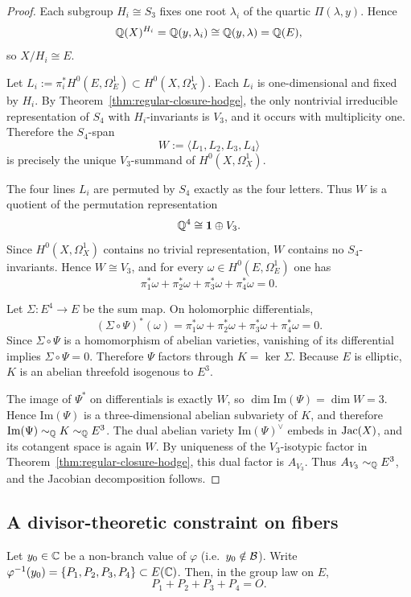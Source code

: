\begin{proof}
Each subgroup \(H_i\cong S_3\) fixes one root \(\lambda_i\) of the quartic \(\Pi(\lambda,y)\).
Hence
\[
\mathbb{Q}(X)^{H_i}=\mathbb{Q}(y,\lambda_i)\cong \mathbb{Q}(y,\lambda)=\mathbb{Q}(E),
\]
so \(X/H_i\cong E\).

Let \(L_i:=\pi_i^*H^0(E,\Omega_E^1)\subset H^0(X,\Omega_X^1)\).
Each \(L_i\) is one-dimensional and fixed by \(H_i\).
By Theorem~\ref{thm:regular-closure-hodge}, the only nontrivial irreducible representation of \(S_4\) with \(H_i\)-invariants is \(V_3\), and it occurs with multiplicity one.
Therefore the \(S_4\)-span
\[
W:=\langle L_1,L_2,L_3,L_4\rangle
\]
is precisely the unique \(V_3\)-summand of \(H^0(X,\Omega_X^1)\).

The four lines \(L_i\) are permuted by \(S_4\) exactly as the four letters.
Thus \(W\) is a quotient of the permutation representation
\[
\mathbb{Q}^4\cong \mathbf{1}\oplus V_3.
\]
Since \(H^0(X,\Omega_X^1)\) contains no trivial representation, \(W\) contains no \(S_4\)-invariants.
Hence \(W\cong V_3\), and for every \(\omega\in H^0(E,\Omega_E^1)\) one has
\[
\pi_1^*\omega+\pi_2^*\omega+\pi_3^*\omega+\pi_4^*\omega=0.
\]

Let \(\Sigma:E^4\to E\) be the sum map.
On holomorphic differentials,
\[
(\Sigma\circ\Psi)^*(\omega)=\pi_1^*\omega+\pi_2^*\omega+\pi_3^*\omega+\pi_4^*\omega=0.
\]
Since \(\Sigma\circ\Psi\) is a homomorphism of abelian varieties, vanishing of its differential implies \(\Sigma\circ\Psi=0\).
Therefore \(\Psi\) factors through \(K=\ker\Sigma\).
Because \(E\) is elliptic, \(K\) is an abelian threefold isogenous to \(E^3\).

The image of \(\Psi^*\) on differentials is exactly \(W\), so \(\dim \mathrm{Im}(\Psi)=\dim W=3\).
Hence \(\mathrm{Im}(\Psi)\) is a three-dimensional abelian subvariety of \(K\), and therefore \(\mathrm{Im}(\Psi)\sim_{\mathbb{Q}}K\sim_{\mathbb{Q}}E^3\).
The dual abelian variety \(\mathrm{Im}(\Psi)^\vee\) embeds in \(\operatorname{Jac}(X)\), and its cotangent space is again \(W\).
By uniqueness of the \(V_3\)-isotypic factor in Theorem~\ref{thm:regular-closure-hodge}, this dual factor is \(A_{V_3}\).
Thus \(A_{V_3}\sim_{\mathbb{Q}}E^3\), and the Jacobian decomposition follows.
\end{proof}

\subsection{A divisor-theoretic constraint on fibers}

\begin{corollary}\label{cor:fiber-sum-zero}
Let $y_0\in\mathbb{C}$ be a non-branch value of $\varphi$ (i.e.\ $y_0\notin\mathcal{B}$).
Write $\varphi^{-1}(y_0)=\{P_1,P_2,P_3,P_4\}\subset E(\mathbb{C})$.
Then, in the group law on $E$,
\[
P_1+P_2+P_3+P_4=O.
\]
\end{corollary}

